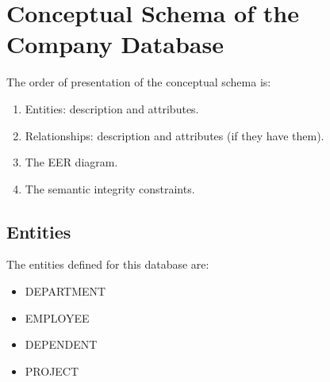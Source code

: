 \documentclass[11pt]{article}
\begin{document}
\section{Conceptual Schema of the Company Database \label{BDGM}}
The order of presentation of the conceptual schema is: 
\begin{enumerate}
\item Entities: description and attributes.
\item Relationships: description and attributes (if they have them).
\item The EER diagram.
\item The semantic integrity constraints.
\end{enumerate}

\subsection{Entities}
\noindent
The entities defined for this database are:
\begin{itemize}
\item DEPARTMENT
\item EMPLOYEE
\item DEPENDENT
\item PROJECT
\end{itemize}
\end{document}
